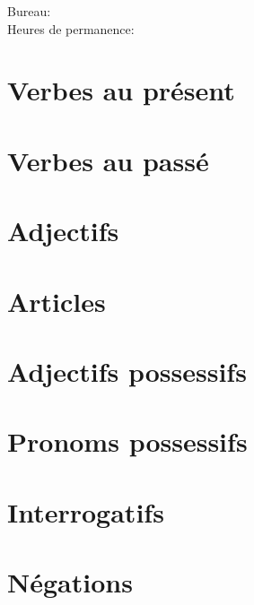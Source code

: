\documentclass{beamer}
\subtitle[Révision]{La révision pour le dernier examen}
\begin{document}
  \begin{frame}
    \titlepage
    \tiny{Bureau: \\
          Heures de permanence: }
  \end{frame}


  \begin{frame}
    \hypertarget{début}{}
    \tableofcontents[hideallsubsections]
  \end{frame}

  \section{Verbes au présent}
  \section{Verbes au passé}
  \section{Adjectifs}
  \section{Articles}
  \section{Adjectifs possessifs}
  \section{Pronoms possessifs}
  \section{Interrogatifs}
  \section{Négations}
\end{document}

